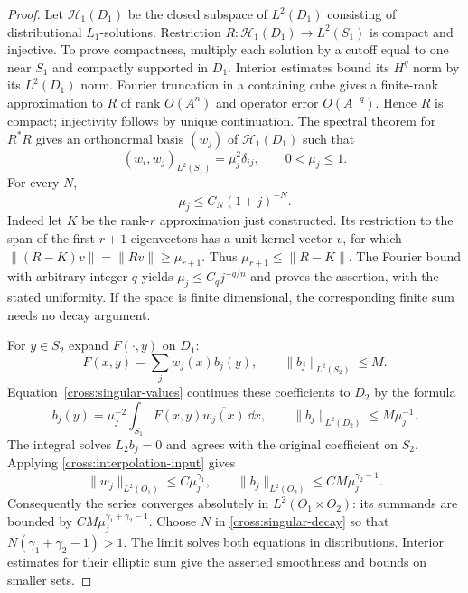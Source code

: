 \begin{proof}
Let $\mathcal H_1(D_1)$ be the closed subspace of $L^2(D_1)$ consisting
of distributional $L_1$-solutions. Restriction
$R:\mathcal H_1(D_1)\to L^2(S_1)$ is compact and injective. To prove
compactness, multiply each solution by a cutoff equal to one near
$\overline{S_1}$ and compactly supported in $D_1$. Interior estimates
bound its $H^q$ norm by its $L^2(D_1)$ norm. Fourier truncation in a
containing cube gives a finite-rank approximation to $R$ of rank
$O(A^n)$ and operator error $O(A^{-q})$. Hence $R$ is compact;
injectivity follows by unique continuation. The spectral theorem
for $R^*R$ gives an orthonormal basis $(w_j)$ of
$\mathcal H_1(D_1)$ such that
\begin{equation}\label{cross:singular-values}
 (w_i,w_j)_{L^2(S_1)}=\mu_j^2\delta_{ij},
 \qquad 0<\mu_j\le1.
\end{equation}
For every $N$,
\begin{equation}\label{cross:singular-decay}
 \mu_j\le C_N(1+j)^{-N}.
\end{equation}
Indeed let $K$ be the rank-$r$ approximation just constructed. Its
restriction to the span of the first $r+1$ eigenvectors has a unit
kernel vector $v$, for which
$\|(R-K)v\|=\|Rv\|\ge\mu_{r+1}$. Thus
$\mu_{r+1}\le\|R-K\|$. The Fourier bound with arbitrary integer $q$
yields $\mu_j\le C_qj^{-q/n}$ and proves the assertion, with the
stated uniformity. If the space is finite dimensional, the corresponding
finite sum needs no decay argument.

For $y\in S_2$ expand $F(\cdot,y)$ on $D_1$:
\[
 F(x,y)=\sum_j w_j(x)b_j(y),\qquad
 \|b_j\|_{L^2(S_2)}\le M.
\]
Equation~\eqref{cross:singular-values} continues these coefficients to
$D_2$ by the formula
\begin{equation}\label{cross:coefficient-extension}
 b_j(y)=\mu_j^{-2}\int_{S_1}F(x,y)\overline{w_j(x)}\,\dd x,
 \qquad \|b_j\|_{L^2(D_2)}\le M\mu_j^{-1}.
\end{equation}
The integral solves $L_2b_j=0$ and agrees with the original coefficient
on $S_2$.  Applying \eqref{cross:interpolation-input} gives
\[
 \|w_j\|_{L^2(O_1)}\le C\mu_j^{\gamma_1},\qquad
 \|b_j\|_{L^2(O_2)}\le CM\mu_j^{\gamma_2-1}.
\]
Consequently the series converges absolutely in $L^2(O_1\times O_2)$:
its summands are bounded by $CM\mu_j^{\gamma_1+\gamma_2-1}$.
Choose $N$ in \eqref{cross:singular-decay} so that
$N(\gamma_1+\gamma_2-1)>1$.  The limit solves both equations
in distributions.  Interior estimates for their elliptic sum give
the asserted smoothness and bounds on smaller sets.


\end{proof}
